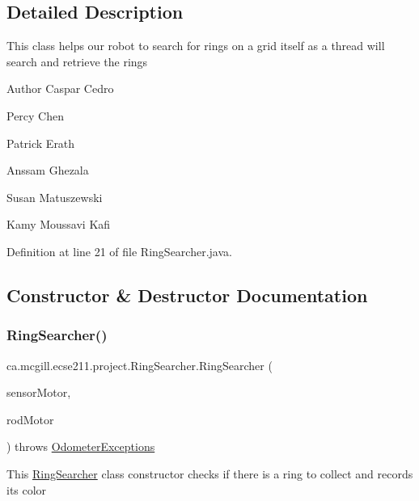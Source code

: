 \subsection{Detailed Description}
This class helps our robot to search for rings on a grid itself as a thread will search and retrieve the rings

\begin{DoxyAuthor}{Author}
Caspar Cedro 

Percy Chen 

Patrick Erath 

Anssam Ghezala 

Susan Matuszewski 

Kamy Moussavi Kafi 
\end{DoxyAuthor}


Definition at line 21 of file Ring\+Searcher.\+java.



\subsection{Constructor \& Destructor Documentation}
\mbox{\label{classca_1_1mcgill_1_1ecse211_1_1project_1_1_ring_searcher_a37eebb6cbdfd692e0979c3ca0fe2597b}} 
\subsubsection{\texorpdfstring{Ring\+Searcher()}{RingSearcher()}}
{\footnotesize\ttfamily ca.\+mcgill.\+ecse211.\+project.\+Ring\+Searcher.\+Ring\+Searcher (\begin{DoxyParamCaption}\item[{E\+V3\+Large\+Regulated\+Motor}]{sensor\+Motor,  }\item[{E\+V3\+Large\+Regulated\+Motor}]{rod\+Motor }\end{DoxyParamCaption}) throws \hyperlink{classca_1_1mcgill_1_1ecse211_1_1odometer_1_1_odometer_exceptions}{Odometer\+Exceptions}}

This \hyperlink{classca_1_1mcgill_1_1ecse211_1_1project_1_1_ring_searcher}{Ring\+Searcher} class constructor checks if there is a ring to collect and records its color


